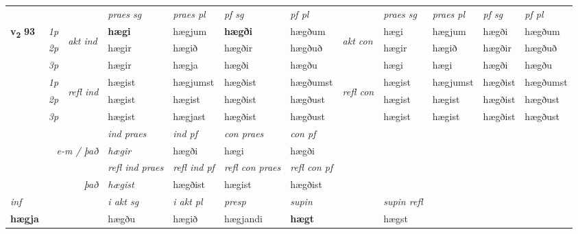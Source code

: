 \begin{longtable}[l]{X>{\footnotesize\itshape}llXXXXlXXXX}
 & &   & \textit{praes sg}  & \textit{praes pl}    & \textit{ pf sg} & \textit{pf pl} & & \textit{praes sg}  & \textit{praes pl}    & \textit{pf sg} & \textit{pf pl }  \\ \cmidrule{4-7} \cmidrule{9-12}
 \multirow{2}{*}{{{\textbf{v{\textsubscript{2}}} \Large{\textbf{93}}}}}  & 1p & \multirow{3}{*}{\begin{turn}{90}\textit{akt ind}\end{turn}} & \textbf{hægi} & hægjum & \textbf{hægði} & hægðum & \multirow{3}{*}{\begin{turn}{90}\textit{akt con}\end{turn}} &hægi & hægjum & hægði & hægðum\\*
 & 2p &  &  hægir  & hægið & hægðir & hægðuð & & hægir & hægið & hægðir & hægðuð \\*
 & 3p &  & hægir & hægja & hægði & hægðu & & hægi & hægi& hægði & hægðu \\*
\cmidrule{4-7} \cmidrule{9-12}
 & 1p & \multirow{3}{*}{\begin{turn}{90}\textit{refl ind}\end{turn}}  & hægist & hægjumst & hægðist & hægðumst & \multirow{3}{*}{\begin{turn}{90}\textit{refl con}\end{turn}}  &hægist & hægjumst & hægðist & hægðumst \\*
 & 2p &  & hægist & hægist & hægðist & hægðust & &hægist & hægist & hægðist & hægðust \\*
 & 3p  & & hægist & hægjast & hægðist & hægðust & & hægist & hægist& hægðist & hægðust \\*
\cmidrule{4-7} \cmidrule{9-12}

   && &  \textit{ind praes} & \textit{ind pf} & \textit{con praes} & \textit{con pf} \\*
\multicolumn{3}{r}{\textit{e-m / það}} & hægir & hægði & hægi & hægði \\*

\cmidrule{4-7}
 & && \textit{refl ind praes} & \textit{refl ind pf} & \textit{refl con praes} & \textit{refl con pf} \\*
\multicolumn{3}{r}{\textit{það}}& hægist & hægðist & hægist & hægðist \\*

\cmidrule{4-7}
   {\textit{inf}} & &  & \textit{i akt sg} & \textit{i akt pl}   & \textit{presp} & \textit{supin} && \textit{supin refl}  \\*
  {\textbf{hægja}} & && hægðu  & hægið   & hægjandi &  \textbf{hægt} && hægst  \\*


\end{longtable}
